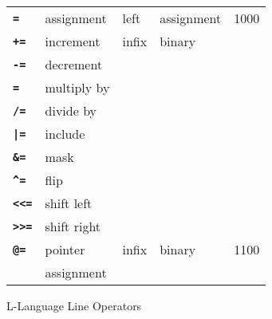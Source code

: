 \documentclass[12pt]{article}
\newcommand{\ttkey}[1]{{\tt \bfseries #1}}
\newlength{\figurewidth}
\newenvironment{boxedfigure}[1][!btp]%
	{\begin{figure*}[#1]
	 \begin{lrbox}{\figurebox}
	 \begin{minipage}{\figurewidth}

	 \vspace*{1ex}}%
	{
	 \vspace*{1ex}

	 \end{minipage}
	 \end{lrbox}

	 \centering
	 \fbox{\hspace*{0.1in}\usebox{\figurebox}\hspace*{0.1in}}
	 \end{figure*}}
\begin{document}
\begin{boxedfigure}[!p]
\begin{center}
\begin{tabular}{|l|l|l|l|r|}
\\\hline
\ttkey{=} & assignment & left & assignment & 1000
\\\cline{1-4}
\ttkey{+=} & increment & infix & binary &
\\\cline{1-2}
\ttkey{-=} & decrement & & &
\\\cline{1-2}
\ttkey{*=} & multiply by & & &
\\\cline{1-2}
\ttkey{/=} & divide by & & &
\\\cline{1-2}
\ttkey{|=} & include & & &
\\\cline{1-2}
\ttkey{\&=} & mask & & &
\\\cline{1-2}
\ttkey{\textasciicircum=} & flip & & &
\\\cline{1-2}
\ttkey{<{}<=} & shift left & & &
\\\cline{1-2}
\ttkey{>{}>=} & shift right & & &
\\\hline
\ttkey{@=} & pointer & infix & binary & 1100 \\
           & assignment & & &
\\\hline
\end{tabular}
\end{center}

\caption{L-Language Line Operators}
\label{L-LANGUAGE-LINE-OPERATORS}
\end{boxedfigure}
\end{document}

